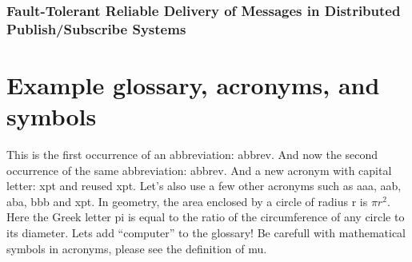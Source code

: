 \subsubsection{Fault-Tolerant Reliable Delivery of Messages in Distributed Publish/Subscribe Systems}



\section{Example glossary, acronyms, and symbols}
%
%
This is the first occurrence of an abbreviation: \gls{abbrev}. And now the second occurrence of the same abbreviation: \gls{abbrev}. And a new acronym with capital letter: \Gls{xpt} and reused \gls{xpt}.  Let's also use a few other acronyms such as \gls{aaa}, \gls{aab}, \gls{aba}, \gls{bbb} and \gls{xpt}.
In geometry, the area enclosed by a circle of radius \gls{r} is $\pi r^2$. Here the Greek letter \gls{pi} is equal to the ratio of the circumference of any circle to its diameter.
Lets add ``\gls{computer}'' to the glossary! Be carefull with mathematical symbols in acronyms, please see the definition of \gls{mu}.


%





\endinput


\typeout{NT FILE chapter2.tex}%

\chapter{NOVAthesis Template \emph{User's Manual}}
\label{cha:users_manual}

\glsresetall

\begin{center}
  \fbox{\LARGE
    This manual is outdated and must be revised!}
\end{center}


